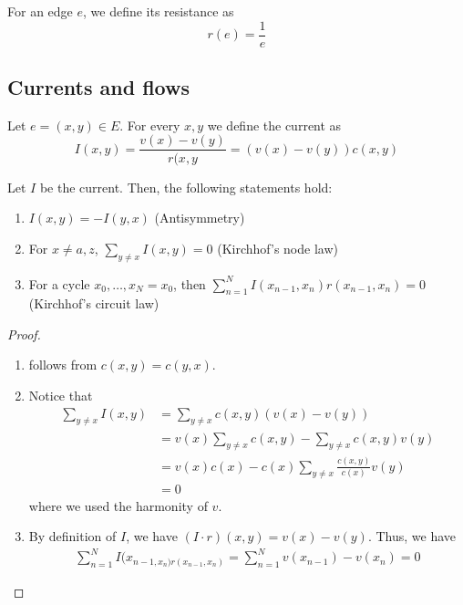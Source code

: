 \begin{defn}[Resistance]
    For an edge $e$, we define its resistance as
    \[r(e)= \frac{1}{e}\]
\end{defn}


\subsection{Currents and flows}

\begin{defn}[Current]
    Let $e=(x,y) \in E$. For every \(x,y\) we define the current as
    \[I(x,y) = \frac{v(x)-v(y)}{r(x,y} = \left(v(x)-v(y)\right) c(x,y)\]
\end{defn}


\begin{lem}
    Let $I$ be the current. Then, the following statements hold:
    \begin{enumerate}
      \item \(I(x,y) = -I(y,x)\) (Antisymmetry) 
      \item For $x\neq a,z$, $\sum_{y\neq x} I(x,y) = 0$ (Kirchhof's node law)
      \item For a cycle ${x}_{0} , \dots , {x}_{N}=x_0 $, then \(\sum_{n=1}^{N} I(x_{n-1},x_n)r(x_{n-1},x_n) = 0\) (Kirchhof's circuit law)
    \end{enumerate}
    
\end{lem}

\begin{proof} \,
    \begin{enumerate}
      \item follows from $c(x,y)=c(y,x)$.
      \item Notice that 
        \begin{align*}
          \sum_{y\neq x}I(x,y) &= \sum_{y\neq x}c(x,y) \left(v(x)-v(y)\right) \\
                               &=v(x)\sum_{y\neq x}c(x,y) - \sum_{y\neq x}c(x,y)v(y) \\
                               &=v(x)c(x) - c(x)\sum_{y\neq x}\frac{c(x,y)}{c(x)}v(y) \\
                               &=0
        \end{align*}
        where we used the harmonity of $v$.
      \item By definition of $I$, we have $(I\cdot r)(x,y)=v(x)-v(y)$. Thus, we have 
        \begin{align*}
          \sum_{n=1}^{N} I(x_{n-1,x_n)r(x_{n-1},x_n)} = \sum_{n=1}^{N} v(x_{n-1})-v(x_n) = 0
        \end{align*}        
    \end{enumerate}
\end{proof}



